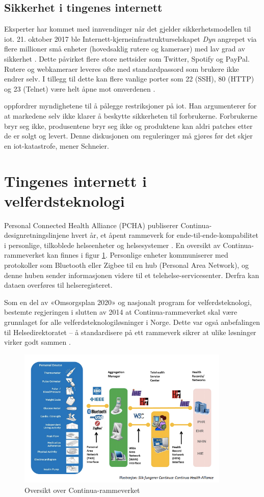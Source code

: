 \subsection{Sikkerhet i tingenes internett}
Eksperter har kommet med innvendinger når det gjelder sikkerhetsmodellen til \gls{iot}.
21. oktober 2017 ble Internett-kjerneinfrastrukturselskapet \textit{Dyn} angrepet via flere millioner
små enheter (hovedsaklig rutere og kameraer) med lav grad av sikkerhet \citep{iot_attack_ddos}.
Dette påvirket flere store nettsider som Twitter, Spotify og PayPal. Rutere og webkameraer leveres
ofte med standardpassord som brukere ikke endrer selv. I tillegg til dette kan flere vanlige
porter som 22 (SSH), 80 (HTTP) og 23 (Telnet) være helt åpne mot omverdenen \citep{iot_mirai_botnet}.

\citet{iot_schneier_regulation} oppfordrer myndighetene til å pålegge restriksjoner på \gls{iot}.
Han argumenterer for at markedene selv ikke klarer å beskytte sikkerheten til forbrukerne.
Forbrukerne bryr seg ikke, produsentene bryr seg ikke og produktene kan aldri patches
etter de er solgt og levert. Denne diskusjonen om reguleringer må gjøres før det skjer
en \gls{iot}-katastrofe, mener Schneier. %


\section{Tingenes internett i velferdsteknologi}
Personal Connected Health Alliance (PCHA) publiserer Continua-designretningslinjene hvert år,
et åpent rammeverk for ende-til-ende-kompabilitet i personlige, tilkoblede helseenheter og helsesystemer \citep{continua_guidelines}.
En oversikt av Continua-rammeverket kan finnes i figur \ref{fig:continua}. Personlige enheter kommuniserer med
protokoller som Bluetooth eller Zigbee til en hub (Personal Area Network), og denne huben sender informasjonen
videre til et telehelse-servicesenter. Derfra kan dataen overføres til helseregisteret.

Som en del av «Omsorgsplan 2020» og nasjonalt program for velferdsteknologi, bestemte regjeringen
i slutten av 2014 at Continua-rammeverket skal være grunnlaget for alle velferdsteknologiløsninger i Norge.
Dette var også anbefalingen til Helsedirektoratet --
å standardisere på ett rammeverk sikrer at ulike løsninger virker godt sammen \citep{regjeringen_continua}.

\begin{figure}
\includegraphics[width=0.9\textwidth,center]{fig/continua}
\caption{Oversikt over Continua-rammeverket}
\label{fig:continua}
\end{figure}
